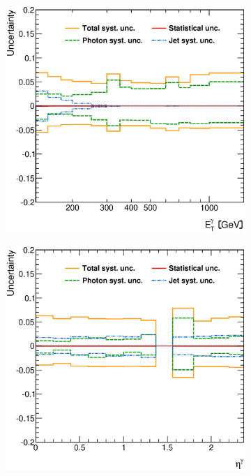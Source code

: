\documentclass[12pt, twoside]{article}
\numberwithin{equation}{section}
\numberwithin{figure}{section}
\newenvironment{changemargin}[2]{%
\begin{list}{}{%
\setlength{\topsep}{0pt}%
\setlength{\leftmargin}{#1}%
\setlength{\rightmargin}{#2}%
\setlength{\listparindent}{\parindent}%
\setlength{\itemindent}{\parindent}%
\setlength{\parsep}{\parskip}%
}%
\item[]}{\end{list}}
\begin{document}
\begin{figure}
    \centering
    \checkoddpage
    \ifoddpage
        \begin{changemargin}{-1.0cm}{-0.75cm}
    \else
        \begin{changemargin}{-0.75cm}{-1.0cm}
    \fi
        \begin{subfigure}[b]{0.37\textwidth}
            \includegraphics[width=\textwidth]{./images/TotalSystematicUncertainty/TOT_SYST-101.eps}
            \subcaption{}
            \label{fig:SystUncerEtPhoton}
        \end{subfigure}
        \begin{subfigure}[b]{0.37\textwidth}
            \includegraphics[width=\textwidth]{./images/TotalSystematicUncertainty/TOT_SYST-102.eps}

\end{subfigure}
\end{changemargin}
\end{changemargin}
\end{figure}
\end{document}
